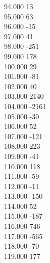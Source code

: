 { 94.000	13 \\
 95.000	63 \\
 96.000	-15 \\
 97.000	41 \\
 98.000	-251 \\
 99.000	178 \\
 100.000	29 \\
 101.000	-81 \\
 102.000	40 \\
 103.000	2140 \\
 104.000	-2161 \\
 105.000	-30 \\
 106.000	52 \\
 107.000	-121 \\
 108.000	223 \\
 109.000	-41 \\
 110.000	118 \\
 111.000	-59 \\
 112.000	-11 \\
 113.000	-150 \\
 114.000	52 \\
 115.000	-187 \\
 116.000	746 \\
 117.000	-565 \\
 118.000	-70 \\
 119.000	177 \\
}
